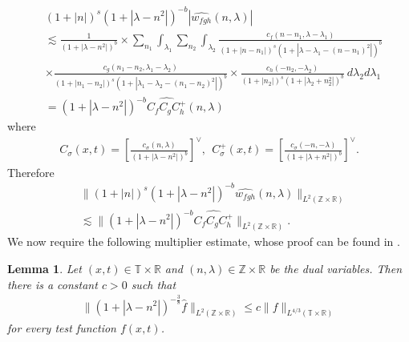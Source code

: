 \documentclass[12pt,reqno]{amsart}
\numberwithin{equation}{section}  %
\newcommand{\rr}{\mathbb{R}}
\newcommand{\zz}{\mathbb{Z}}
\newcommand{\ci}{\mathbb{T}}
\newcommand{\wh}{\widehat}
\newtheorem{lemma}[theorem]{Lemma}
\begin{document}
\begin{equation*}
	\begin{split}
		& \left (1 + |n| \right )^s \left( 1 +  | \lambda - n^{2}  | \right)^{-b} | 
		\wh{w_{fgh}}\left( n, \lambda \right) | 
		\\
    & \lesssim  \frac{1}{\left( 1 +
		| \lambda - n^{2}| 
		\right)^{b}}  
		\times
    \sum_{n_{1} } \int_{\lambda_{1}} \sum_{n_{2}}
    \int_{\lambda_{2}} \frac{c_f\left( n - n_{1}, \lambda - \lambda_1 
		\right)}{\left (1 + |n - n_{1}| \right )^s \left( 1 + | \lambda - \lambda_1 - (n - n_{1})^{2} |
		\right)^{b}}
		\\
		& \times \frac{c_{g}\left( n_1 - n_2, \lambda_1 - \lambda_2 \right)}{\left (1 + |n_1 - n_2| \right ) 
		^s\left( 1 + | \lambda_1 - \lambda_2 -  (n_1 - n_2)^{2}| 
		\right)^{b}}
    \times \frac{c_{h}\left( -n_2, -\lambda_2 \right)}{\left (1 + |n_2| \right )
    ^s \left( 1 + | \lambda_2 + n_2^{2} | \right)^{b}} \ d \lambda_2 d \lambda_1 
    \\
		& = \left( 1 + | \lambda - n^{2} | \right)^{-b}
		\wh{C_f C_{g} C^+_{h}} \left( n, \lambda \right)
	\end{split}
\end{equation*}
%
%
where
%
%
\begin{equation*}
	\begin{split}
		C_\sigma(x, t) = \left[ \frac{c_\sigma\left( n, \lambda \right)}{\left( 
		1 + | \lambda - n^{2} | \right)^{b}} \right]^\vee,
		\ \ C^+_\sigma(x, t) = \left[ \frac{c_\sigma\left( -n, -\lambda \right)}{\left( 
		1 + | \lambda + n^{2} | \right)^{b}} \right]^\vee.
	\end{split}
\end{equation*}
%
%
Therefore
%
%
\begin{equation}
	\label{ngen-holder-pre-estimate}
	\begin{split}
		& \| \left( 1 + |n | \right)^s
		\left( 1 + | \lambda - n^{2} | \right)^{-b} \wh{w_{fgh}}(n, 
		\lambda)		
		\|_{L^2(\zz \times \rr)}
		\\
		& \lesssim \| \left( 1 + | \lambda - n^{2} | \right)^{-b}
		\wh{C_f C_{g} C^+_{h}} \|_{L^2(\zz \times \rr)}.
	\end{split}
\end{equation}
%
We now require the following multiplier estimate, whose proof can be found in
\cite{Bourgain-Fourier-transfo-1}. 
%
%
%
%
%
%
%
%
%
%
%
%
%
%
\begin{lemma}
	\label{nlem:four-mult-est-L4}
	Let $(x, t) \in \ci \times \rr $ and $(n, \lambda) \in \zz \times \rr$ be 
	the dual variables. Then there is a 
	constant $c > 0$ such that
%
%
\begin{equation}
	\label{nfour-mult-est-L4*}
	\begin{split}
    \| \left( 1 + | \lambda - n^{2} | 
		\right)^{-\frac{3}{8}}
		\wh{f}\|_{L^2(\zz \times \rr)} \le c \|f \|_{L^{4/3}( \ci \times \rr)}
	\end{split}
\end{equation}
for every test function $f(x, t)$. 
%
%
\end{lemma}
\end{document}
